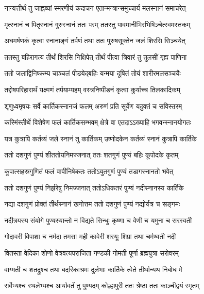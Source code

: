 \twolineshloka
{नान्यत्तीर्थं तु जाह्नव्यां स्मरणीयं कदाचन}
{एतान्मन्त्रान्समुच्चार्य मलस्नानं समाचरेत्} %

\twolineshloka
{मृत्स्नानं च पितृस्नानं गुरुस्नानं ततः परम्}
{ततस्तु पावमानीभिरभिषिञ्चेत्स्वमस्तकम्} %

\twolineshloka
{अघमर्षणकं कृत्वा स्नानाङ्गं तर्पणं तथा}
{ततः पुरुषसूक्तेन जलं शिरसि सिञ्चयेत्} %

\twolineshloka
{ततस्तु बहिरागत्य तीर्थं शिरसि निक्षिपेत्}
{तीर्थं पीत्वा त्रिवारं तु तुलसीं गृह्य पाणिना} %

\twolineshloka
{ततो जलाद्विनिष्क्रम्य चाञ्चलं पीडयेद्बहिः}
{यन्मया दूषितं तोयं शारीरमलसञ्चयैः} %

\twolineshloka
{तद्दोषपरिहारार्थं यक्ष्मणं तर्पयाम्यहम्}
{वस्त्रनिष्पीडनं कृत्वा कुर्याच्च तिलकादिकम्} %


\twolineshloka
{शृणुध्वमृषयः सर्वे कार्तिकस्नानजं फलम्}
{अरुणं प्रति सूर्येण यदुक्तं च सविस्तरम्} %


\twolineshloka
{कस्मिंस्तीर्थे विशेषेण फलं कार्तिकसम्भवम्}
{क्षेत्रे वा एतदाऽऽख्याहि भगवन्स्नानयोगतः} %


\twolineshloka
{यत्र कुत्रापि कर्तव्यं जले स्नानं तु कार्तिकम्}
{उष्णोदकेन कर्तव्यं स्नानं कुत्रापि कार्तिके} %

\twolineshloka
{ततो दशगुणं पुण्यं शीततोयनिमज्जनात्}
{ततः शतगुणं पुण्यं बहिः कूपोदके कृतम्} %

\twolineshloka
{कूपात्सहस्रगुणितं फलं वापीनिषेकतः}
{ततोऽयुतगुणं पुण्यं तडागस्नानतो भवेत्} %

\twolineshloka
{ततो दशगुणं पुण्यं निर्झरेषु निमज्जनात्}
{ततोऽधिकतरं पुण्यं नदीस्नानस्य कार्तिके} %

\twolineshloka
{नद्या दशगुणं प्रोक्तं तीर्थस्नानं खगोत्तम}
{ततो दशगुणं पुण्यं नद्योर्यत्र च सङ्गमः} %

\twolineshloka
{नदीत्रयस्य संयोगे पुण्यस्यान्तो न विद्यते}
{सिन्धुः कृष्णा च वेणी च यमुना च सरस्वती} %

\twolineshloka
{गोदावरी विपाशा च नर्मदा तमसा मही}
{कावेरी शरयूः शिप्रा तथा चर्मण्वती नदी} %

\twolineshloka
{वितस्ता वेदिका शोणो वेत्रवत्यपराजिता}
{गण्डकी गोमती पूर्णा ब्रह्मपुत्रा सरोवरम्} %

\twolineshloka
{वाग्मती च शतद्रुश्च तथा बदरिकाश्रमः}
{दुर्लभाः कार्तिके त्वेते तीर्थान्यथ निबोध मे} %

\twolineshloka
{सर्वेभ्यश्च स्थलेभ्यश्च आर्यावर्तं तु पुण्यदम्}
{कोल्हापुरी ततः श्रेष्ठा ततः काञ्चीद्वयं स्मृतम्} %

